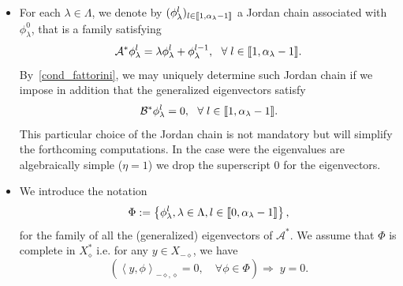 \documentclass[10pt]{amsart}
\theoremstyle{definition}\newtheorem{defi}[theo]{Definition}\newtheorem{rema}[theo]{Remark}\newtheorem{exam}[theo]{Example}\newtheorem{exem}[theo]{Example}\newtheorem{nota}[theo]{Notation}
\newcommand{\llbracket}{\mathopen{[\mkern -2.7mu[}}
\newcommand{\rrbracket}{\mathclose{]\mkern -2.7mu]}}
\newcommand{\inter}[2]{\llbracket #1,#2 \rrbracket}
\newcommand\As{\mathcal{A}^*}
\newcommand\Bs{\mathcal{B}^*}
\newcommand{\Xalphas}{X_\diamond^*}
\newcommand{\Xmalpha}{X_{-\diamond}}
\newcommand{\Fzp}{Y_0}
\newcommand{\dual}[2]{\left\langle #1, #2 \right\rangle_{-\diamond,\diamond}}
\let\oldforall\forall
\renewcommand*{\forall}{\mathrel{\oldforall}}
\begin{document}
\begin{itemize}
As we are interested in null-controllability properties of system~\eqref{systeme}, we will first assume that
\begin{equation}\label{cond_fattorini}
\Bs \phi_\lambda^0 \neq 0, \ \ \text{for any } \lambda\in \Lambda.
\end{equation}
This is a necessary condition for the approximate controllability of system~\eqref{systeme}, and is therefore mandatory if we expect null-controllability to hold. In our setting, the assumption~\eqref{cond_fattorini} is also a sufficient condition for approximate controllability (see~\cite{Fattorini66, Olive13}).

When the considered set of initial data $\Fzp$ is not the whole space $\Xmalpha$, the approximate controllability condition~\eqref{cond_fattorini} can be too strong and we can relax it. We will discuss this point in Section~\ref{Sec:Gestion_de_B*}.


\item For each $\lambda\in \Lambda$, we denote by $(\phi_\lambda^l)_{l \in \inter{1}{\alpha_\lambda-1}}$ a Jordan chain associated with $\phi_\lambda^0$, that is a family satisfying
\begin{equation*}\label{def_chaine_Jordan}
\As \phi_\lambda^l = \lambda \phi_\lambda^l + \phi_\lambda^{l-1}, \ \ \forall l\in \inter{1}{\alpha_{\lambda}-1}.
\end{equation*}
By~\eqref{cond_fattorini}, we may uniquely determine such Jordan chain if we impose in addition that the generalized eigenvectors satisfy
\begin{equation}\label{normalisation_chaine_Jordan}
\Bs \phi_\lambda^l = 0, \ \ \forall l \in \inter{1}{\alpha_{\lambda}-1}.
\end{equation}
This particular choice of the Jordan chain is not mandatory but will simplify the forthcoming computations. In the case were the eigenvalues are algebraically simple ($\eta =1$) we drop the superscript $0$ for the eigenvectors.
\item We introduce the notation
\[
\Phi:=\left\{\phi_\lambda^l, \lambda\in \Lambda, l\in \inter{0}{\alpha_\lambda-1} \right\},
\]
for the family of all the (generalized) eigenvectors of $\As$. We assume that $\Phi$ is complete in $\Xalphas$ i.e. for any $y \in \Xmalpha$, we have
\begin{equation}\label{FamilleComplete}
\left(\dual{y}{\phi} =0, \quad \forall \phi\in \Phi \right) \Longrightarrow \; y=0.
\end{equation}
\end{itemize}
\end{document}
